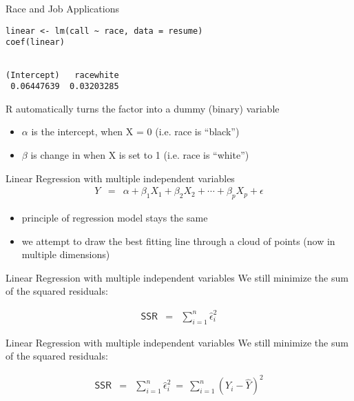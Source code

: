 \documentclass[presentation]{beamer}
\begin{document}
\begin{frame}[fragile,shrink=20,label={sec:org5a08210}]{Race and Job Applications}
 \begin{verbatim}
linear <- lm(call ~ race, data = resume)
coef(linear)
\end{verbatim}

\begin{verbatim}

(Intercept)   racewhite 
 0.06447639  0.03203285
\end{verbatim}

R automatically turns the factor into a dummy (binary) variable


\pause

\begin{itemize}
\item \(\alpha\) is the intercept, when X = 0 (i.e. race is ``black'')
\item \(\beta\) is change in  when X is set to 1 (i.e. race is ``white'')
\end{itemize}
\end{frame}


\begin{frame}[label={sec:orgc1d94bc}]{Linear Regression with multiple independent variables}
\begin{eqnarray*}
      Y & = & \alpha + \beta_1 X_1 + \beta_2 X_2 + \cdots + \beta_p X_p + \epsilon
\end{eqnarray*}

\begin{itemize}
\item principle of regression model stays the same

\item we attempt to draw the best fitting line through a cloud of points (now in multiple dimensions)
\end{itemize}
\end{frame}

\begin{frame}[label={sec:org539d21e}]{Linear Regression with multiple independent variables}
We still minimize the sum of the squared residuals:

\begin{eqnarray*}
      \textsf{SSR} & = & \sum_{i=1}^n \hat\epsilon_i^2
    \end{eqnarray*}
\end{frame}


\begin{frame}[label={sec:org6e420f8}]{Linear Regression with multiple independent variables}
We still minimize the sum of the squared residuals:

\begin{eqnarray*}
      \textsf{SSR} & = & \sum_{i=1}^n \hat\epsilon_i^2 \ = \ \sum_{i=1}^n
                         (Y_i - \hat{Y})^2
    \end{eqnarray*}
\end{frame}
\end{document}
